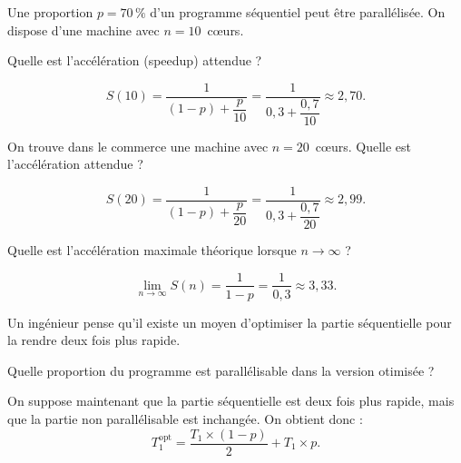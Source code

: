 
\begingroup

\begin{exercice}
  \label{exo:introduction/amdahl}

  Une proportion $p=70\,\%$ d'un programme séquentiel peut être parallélisée. On dispose d'une machine avec $n=10$~c\oe urs.

  \begin{questions} 
  \item Quelle est l'accélération (speedup) attendue ?
  \end{questions}
  \begin{corrections}
    $$ S(10)=\dfrac{1}{(1-p)+\dfrac{p}{10}} = \dfrac{1}{0,3+\dfrac{0,7}{10}} \approx 2,70. $$
  \end{corrections}

  \begin{questions} 
  \item On trouve dans le commerce une machine avec $n=20$~c\oe urs. Quelle est l'accélération attendue ?
  \end{questions}
  \begin{corrections}
    $$ S(20)=\dfrac{1}{(1-p)+\dfrac{p}{20}} = \dfrac{1}{0,3+\dfrac{0,7}{20}} \approx 2,99. $$
  \end{corrections}

  \begin{questions} 
  \item Quelle est l'accélération maximale théorique lorsque $n \to \infty$ ?
  \end{questions}
  \begin{corrections}
    $$ \lim_{n\to\infty} S(n) = \dfrac{1}{1-p} = \dfrac{1}{0,3} \approx 3,33. $$
  \end{corrections}

  Un ingénieur pense qu'il existe un moyen d'optimiser la partie séquentielle pour la rendre deux fois plus rapide.

  \begin{questions} 
  \item Quelle proportion du programme est parallélisable dans la version otimisée ? 
  \end{questions}
  \begin{corrections}
    On suppose maintenant que la partie séquentielle est deux fois plus rapide,
    mais que la partie non parallélisable est inchangée.
    On obtient donc : 
    $$T_1^{\mathrm{opt}} = \dfrac{T_1 \times (1-p)}{2} + T_1 \times p. $$


\end{corrections}
\end{exercice}
